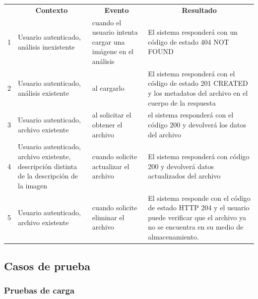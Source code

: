 \begin{center}
\begin{longtable}{|p{0.7cm}|p{4cm}|p{4cm}|p{5cm}| }

	\hline 
		\rowcolor[gray]{0.9} 
		\multicolumn{4}{|c|}{\textbf{Criterio de aceptación}} \\
	\hline
    	\rowcolor[gray]{0.9} 
    	\multicolumn{1}{|c}{\textbf{Id}} & \multicolumn{1}{|c}{\textbf{Contexto}} &  \multicolumn{1}{|c}{\textbf{Evento}} & \multicolumn{1}{|c|}{\textbf{Resultado}} \\
    \hline
    	
1&Usuario autenticado, análisis inexistente & cuando el usuario intenta cargar una imágene en el análisis & El sistema responderá con un código de estado 404 NOT FOUND\\ \hline
 
2& Usuario autenticado, análisis existente   & al cargarlo & El sistema responderá con el código de estado 201 CREATED y los metadatos del archivo en el cuerpo de la respuesta\\ \hline

3& Usuario autenticado, archivo existente & al solicitar el obtener el archivo & el sistema responderá con el código 200 y devolverá los datos del archivo\\ \hline

4& Usuario autenticado, archivo existente, descripción distinta de la descripción de la imagen & cuando solicite actualizar el archivo & El sistema responderá con código 200 y devolverá datos actualizados del archivo\\ \hline

5& Usuario autenticado, archivo existente & cuando solicite eliminar el archivo & El sistema responde con el código de estado HTTP 204 y el usuario puede verificar que el archivo ya no se encuentra en su medio de almacenamiento.\\ \hline

  \end{longtable}
\end{center}


\subsection{Casos de prueba}

\clearpage
\subsubsection{Pruebas de carga}

